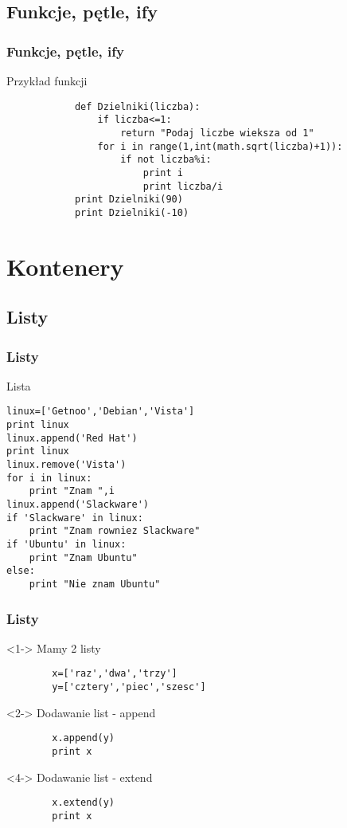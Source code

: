 \documentclass[10pt]{beamer}
\begin{document}
\subsection{Funkcje, pętle, ify}
\begin{frame}[fragile]
	\frametitle{Funkcje, pętle, ify}
	\begin{block}
		{Przykład funkcji}
		\begin{lstlisting}
			def Dzielniki(liczba):
			    if liczba<=1:
			        return "Podaj liczbe wieksza od 1"
			    for i in range(1,int(math.sqrt(liczba)+1)):
			        if not liczba%i:
			            print i
			            print liczba/i
			print Dzielniki(90)
			print Dzielniki(-10)
		\end{lstlisting}
	\end{block}
\end{frame}
\section{Kontenery}
\subsection{Listy}
\begin{frame}[fragile]
	\frametitle{Listy}
	\begin{block}
		{Lista}
		\begin{lstlisting}
linux=['Getnoo','Debian','Vista']
print linux
linux.append('Red Hat')
print linux
linux.remove('Vista')
for i in linux:
    print "Znam ",i
linux.append('Slackware')
if 'Slackware' in linux:
    print "Znam rowniez Slackware"
if 'Ubuntu' in linux:
    print "Znam Ubuntu"
else:
    print "Nie znam Ubuntu"
		\end{lstlisting}
	\end{block}
\end{frame}
\begin{frame}[fragile]
	\frametitle{Listy}
	\begin{block}<1->
		{Mamy 2 listy}
		\begin{lstlisting}
		x=['raz','dwa','trzy']
		y=['cztery','piec','szesc']
		\end{lstlisting}
	\end{block}
	\begin{block}<2->
		{Dodawanie list - append}
		\begin{lstlisting}
		x.append(y)
		print x
		\end{lstlisting}
	\end{block}
	\begin{block}<4->
		{Dodawanie list - extend}
		\begin{lstlisting}
		x.extend(y)
		print x
		\end{lstlisting}
	\end{block}
\end{frame}
\end{document}
